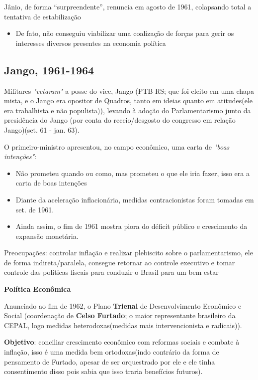 \documentclass[a4paper,12pt]{article}[abntex2]
\begin{document}
Jânio, de forma “surpreendente”, renuncia em agosto de 1961, colapsando total a tentativa de estabilização\begin{itemize}
    \item De fato, não conseguiu viabilizar uma coalização de forças para gerir os interesses diversos presentes na economia política
\end{itemize}

\subsection{\textbf{Jango, 1961-1964}}

Militares \textit{"vetaram"} a posse do vice, Jango (PTB-RS; que foi eleito em uma chapa mista, e o Jango era opositor de Quadros, tanto em ideias quanto em atitudes(ele era trabalhista e não populista)), levando à adoção do Parlamentarismo junto da presidência do Jango (por conta do receio/desgosto do congresso em relação Jango)(set. 61 - jan. 63).
    
O primeiro-ministro apresentou, no campo econômico, uma carta de \textit{"boas intenções"}:
    \begin{itemize}
        \item Não prometeu quando ou como, mas prometeu o que ele iria fazer, isso era a carta de boas intenções 
        \item Diante da aceleração inflacionária, medidas contracionistas foram tomadas em set. de 1961.
        \item Ainda assim, o fim de 1961 mostra piora do déficit público e crescimento da expansão monetária.
    \end{itemize}

Preocupações: controlar inflação e realizar plebiscito sobre o parlamentarismo, ele de forma indireta/paralela, consegue retornar ao controle executivo e tomar controle das políticas fiscais para conduzir o Brasil para um bem estar

\textbf{Política Econômica}

Anunciado ao fim de 1962, o Plano \textbf{Trienal} de Desenvolvimento Econômico e Social (coordenação de \textbf{Celso Furtado}; o maior representante brasileiro da CEPAL, logo medidas heterodoxas(medidas mais intervencionista e radicais)).

\textbf{Objetivo}: conciliar crescimento econômico com reformas sociais e combate à inflação, isso é uma medida bem ortodoxas(indo contrário da forma de pensamento de Furtado, apesar de ser orquestrado por ele e ele tinha consentimento disso pois sabia que isso traria benefícios futuros).
\end{document}
